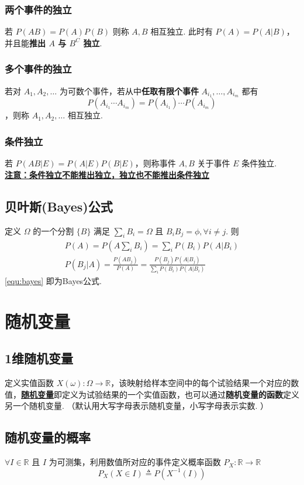 \documentclass[./main.tex]{subfiles}
\begin{document}
\subsubsection{两个事件的独立}
若 $P(AB)=P(A)P(B)$ 则称 $A,B$ 相互独立. 此时有 $P(A)=P(A|B)$，并且能\textbf{推出 $A$ 与 $B^C$ 独立}. 
\subsubsection{多个事件的独立}
若对 $A_1,A_2,\dots$ 为可数个事件，若从中\textbf{任取有限个事件} $A_{i_1},\dots,A_{i_m}$ 都有 $$P(A_{i_1}\cdots A_{i_m})=P(A_{i_1})\cdots P(A_{i_m})$$，则称 $A_1,A_2,\dots$ 相互独立. 
\subsubsection{条件独立}
若 $P(AB|E)=P(A|E)P(B|E)$，则称事件 $A,B$ 关于事件 $E$ 条件独立. \\
\indent \underline{\textbf{注意：条件独立不能推出独立，独立也不能推出条件独立}}
\subsection{贝叶斯(Bayes)公式}
定义 $\Omega$ 的一个分割 $\{B\}$ 满足 $\sum_i B_i=\Omega$ 且 $B_iB_j=\phi,\forall i\neq j$. 则
\begin{gather}
    P(A)=P(A\sum_iB_i)=\sum_iP(B_i)P(A|B_i)\\
    P(B_j|A)=\frac{P(AB_j)}{P(A)}=\frac{P(B_j)P(A|B_j)}{\sum_iP(B_i)P(A|B_i)}\label{equ:bayes}
\end{gather}
\eqref{equ:bayes} 即为Bayes公式. 
\section{随机变量}
\subsection{1维随机变量}
定义实值函数 $X(\omega):\Omega\rightarrow\mathbb{R}$，该映射给样本空间中的每个试验结果一个对应的数值，\underline{\textbf{随机变量}}即定义为试验结果的一个实值函数，也可以通过\textbf{随机变量的函数}定义另一个随机变量. {\kaishu（默认用大写字母表示随机变量，小写字母表示实数. ）}
\subsection{随机变量的概率}
$\forall I\in\mathbb{R}$ 且 $I$ 为可测集，利用数值所对应的事件定义概率函数 $P_X:\mathbb{R}\rightarrow\mathbb{R}$
$$P_X(X\in I)\triangleq P(X^{-1}(I))$$
\end{document}
